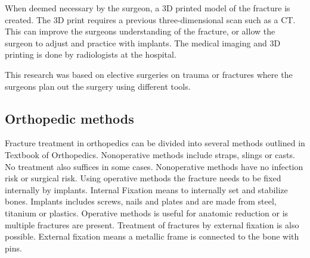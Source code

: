 \documentclass[a4paper]{report}
\begin{document}
When deemed necessary by the surgeon, a 3D printed model of the fracture is created. The 3D print requires a previous three-dimensional scan such as a CT. This can improve the surgeons understanding of the fracture, or allow the surgeon to adjust and practice with implants. The medical imaging and 3D printing is done by radiologists at the hospital.

This research was based on elective surgeries on trauma or fractures where the surgeons plan out the surgery using different tools.

\subsection{Orthopedic methods}

Fracture treatment in orthopedics can be divided into several methods outlined in Textbook of Orthopedics\cite{ebnezar_textbook_2016}.
Nonoperative methods include straps, slings or casts. No treatment also suffices in some cases.
Nonoperative methods have no infection risk or surgical risk.
Using operative methods the fracture needs to be fixed internally by implants.
Internal Fixation means to internally set and stabilize bones\cite{ebnezar_textbook_2016}.
Implants includes screws, nails and plates and are made from steel, titanium or plastics.
Operative methods is useful for anatomic reduction or is multiple fractures are present.
Treatment of fractures by external fixation is also possible. External fixation means a metallic frame is connected to the bone with pins.

\end{document}
